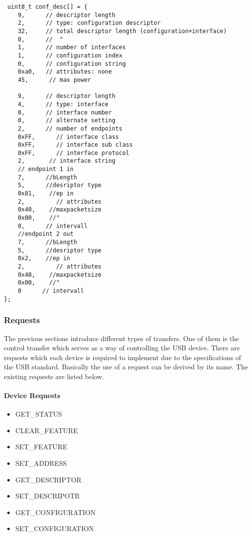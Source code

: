 \begin{verbatim}
 uint8_t conf_desc[] = {
	9,      // descriptor length
	2,      // type: configuration descriptor
	32,     // total descriptor length (configuration+interface)
	0,      //  "
	1,      // number of interfaces
	1,      // configuration index
	0,      // configuration string
	0xa0,   // attributes: none
	45,      // max power

	9,      // descriptor length
	4,      // type: interface
	0,      // interface number
	0,      // alternate setting
	2,      // number of endpoints
	0xFF,      // interface class
	0xFF,      // interface sub class
	0xFF,      // interface protocol
	2,       // interface string
	// endpoint 1 in
	7,      //bLength
	5,      //desriptor type
	0x81,    //ep in
	2,         // attributes
	0x40,    //maxpacketsize
	0x00,    //"
	0,      // intervall
	//endpoint 2 out
	7,      //bLength
	5,      //desriptor type
	0x2,    //ep in
	2,         // attributes
	0x40,    //maxpacketsize
	0x00,    //"
	0      // intervall
}; 
\end{verbatim}

\subsubsection{Requests}

The previous sections introduce different types of transfers. One of them is the control transfer which serves as a way of controlling 
the USB device. There are requests which each device is required to implement due to the specifications of the USB standard. Basically 
the use of a request can be derived by its name. The existing requests are listed below.%

\paragraph{Device Requests}
\begin{itemize}
 \item GET\_STATUS
 \item CLEAR\_FEATURE
 \item SET\_FEATURE
 \item SET\_ADDRESS
 \item GET\_DESCRIPTOR
 \item SET\_DESCRIPOTR
 \item GET\_CONFIGURATION
 \item SET\_CONFIGURATION
\end{itemize}


